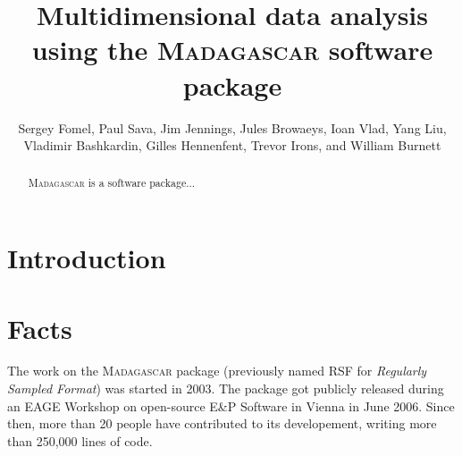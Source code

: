 \title{Multidimensional data analysis \\ using the \textsc{Madagascar} software package}

\renewcommand{\thefootnote}{\fnsymbol{footnote}} 

\author{Sergey Fomel\footnotemark[1], Paul Sava\footnotemark[2], Jim Jennings, Jules Browaeys, Ioan Vlad, Yang Liu\footnotemark[1], Vladimir Bashkardin\footnotemark[1],  Gilles Hennenfent, Trevor Irons, and William Burnett\footnotemark[1]}


\address{
\footnotemark[1]Bureau of Economic Geology, \\
John A. and Katherine G. Jackson School of Geosciences \\
The University of Texas at Austin \\
University Station, Box X \\
Austin, TX 78713-8972 \\
\footnotemark[2] Center for Wave Phenomena \\
Department of Geophysics \\
Colorado School of Mines \\
Golden, CO 80401}


\maketitle

\begin{abstract}
  \textsc{Madagascar} is a software package...
\end{abstract}

\section{Introduction}

\section{Facts}

The work on the \textsc{Madagascar} package (previously named RSF for \emph{Regularly
Sampled Format}) was started in 2003.  The package got
publicly released during an EAGE Workshop on open-source E\&P Software
in Vienna in June 2006. Since then, more than 20 people have
contributed to its developement, writing more than 250,000 lines of code.

